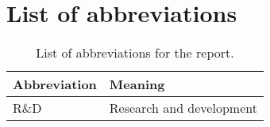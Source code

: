 \chapter{List of abbreviations}
\begin{table}[H]
    \centering
    \begin{tabular}{|p{}|p{}|}
    \hline
    \rowcolor{gray!30}
    \textbf{Abbreviation} & \textbf{Meaning} \\ \hline
    R\&D & Research and development \\ \hline
    \end{tabular}
    \caption{List of abbreviations for the report.}
    \label{tab:02abb:listAbbreviations}
\end{table}
